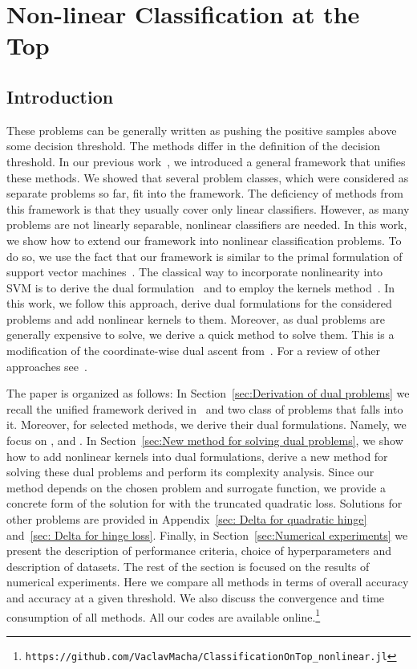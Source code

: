 \chapter{Non-linear Classification at the Top}\label{chap: dual}

\section{Introduction}

These problems can be generally written as pushing the positive samples above some decision threshold. The methods differ in the definition of the decision threshold. In our previous work~\cite{adam2021general}, we introduced a general framework that unifies these methods. We showed that several problem classes, which were considered as separate problems so far, fit into the framework. The deficiency of methods from this framework is that they usually cover only linear classifiers. However, as many problems are not linearly separable, nonlinear classifiers are needed. In this work, we show how to extend our framework into nonlinear classification problems. To do so, we use the fact that our framework is similar to the primal formulation of support vector machines~\cite{cortes1995support}. The classical way to incorporate nonlinearity into SVM is to derive the dual formulation~\cite{boyd2004convex} and to employ the kernels method~\cite{scholkopf2001learning}. In this work, we follow this approach, derive dual formulations for the considered problems and add nonlinear kernels to them. Moreover, as dual problems are generally expensive to solve, we derive a quick method to solve them. This is a modification of the coordinate-wise dual ascent from~\cite{hsieh2008dual}. For a review of other approaches see~\cite{batmaz2019review,werner2019review}.

The paper is organized as follows: In Section~\ref{sec:Derivation of dual problems} we recall the unified framework derived in~\cite{adam2021general} and two class of problems that falls into it. Moreover, for selected methods, we derive their dual formulations. Namely, we focus on \TopPush, \TopPushK and \PatMat. In Section~\ref{sec:New method for solving dual problems}, we show how to add nonlinear kernels into dual formulations, derive a new method for solving these dual problems and perform its complexity analysis. Since our method depends on the chosen problem and surrogate function, we provide a concrete form of the solution for \TopPushK with the truncated quadratic loss. Solutions for other problems are provided in Appendix~\ref{sec: Delta for quadratic hinge} and~\ref{sec: Delta for hinge loss}. Finally, in Section~\ref{sec:Numerical experiments} we present the description of performance criteria, choice of hyperparameters and description of datasets. The rest of the section is focused on the results of numerical experiments. Here we compare all methods in terms of overall accuracy and accuracy at a given threshold. We also discuss the convergence and time consumption of all methods. All our codes are available online.\footnote{\texttt{https://github.com/VaclavMacha/ClassificationOnTop\_nonlinear.jl}}

